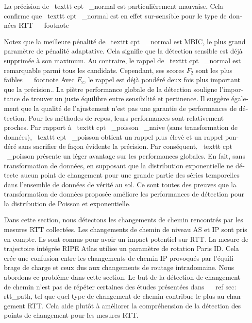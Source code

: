 \begin{otherlanguage}{french}
{{La précision de \ texttt {cpt \ _normal} est particulièrement mauvaise.
Cela confirme que \ texttt {cpt \ _normal} est en effet sur-sensible pour le type de données RTT ~ \ footnote {Notez que la meilleure pénalité de \ texttt {cpt \ _normal} est MBIC, le plus grand paramètre de pénalité adaptative. Cela signifie que la détection sensible est déjà supprimée à son maximum.
Au contraire, le rappel de \ texttt {cpt \ _normal} est remarquable parmi tous les candidats.
Cependant, ses scores $ F_2 $ sont les plus faibles ~ \ footnote {Avec $ F_2 $, le rappel est déjà pondéré deux fois plus important que la précision.}.
La piètre performance globale de la détection souligne l'importance de trouver un juste équilibre entre sensibilité et pertinence.
Il suggère également que la qualité de l'ajustement n'est pas une garantie de performances de détection.
Pour les méthodes de repos, leurs performances sont relativement proches.
Par rapport à \ texttt {cpt \ _poisson \ _naive} (sans transformation de données), \ texttt {cpt \ _poisson} obtient un rappel plus élevé et un rappel pondéré sans sacrifier de façon évidente la précision.
Par conséquent, \ texttt {cpt \ _poisson} présente un léger avantage sur les performances globales.
En fait, sans transformation de données, en supposant que la distribution exponentielle ne détecte aucun point de changement pour une grande partie des séries temporelles dans l'ensemble de données de vérité au sol.
Ce sont toutes des preuves que la transformation de données proposée améliore les performances de détection pour la distribution de Poisson et exponentielle.

Dans cette section, nous détectons les changements de chemin rencontrés par les mesures RTT collectées.
Les changements de chemin de niveau AS et IP sont pris en compte.
Ils sont connus pour avoir un impact potentiel sur RTT.
La mesure de trajectoire intégrée RIPE Atlas utilise un paramètre de rotation Paris ID.
Cela crée une confusion entre les changements de chemin IP provoqués par l'équilibrage de charge et ceux dus aux changements de routage intradomaine.
Nous abordons ce problème dans cette section.
Le but de la détection de changement de chemin n'est pas de répéter certaines des études présentées dans ~ \ ref {sec: rtt_path},
tel que quel type de changement de chemin contribue le plus au changement RTT.
Cela aide plutôt à améliorer la compréhension de la détection des points de changement pour les mesures RTT.

}}}
\end{otherlanguage}
